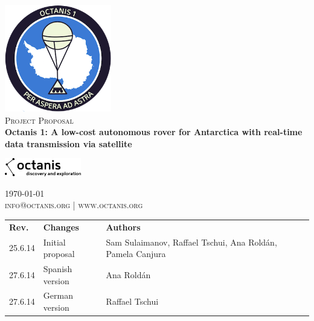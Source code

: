 \documentclass[a4paper,12pt]{article}
\begin{document}
\begin{titlepage}
\begin{center}

\includegraphics[width=0.35\textwidth]{patch}~\\[2cm]

\textsc{\Large Project Proposal}\\[0.5cm]

\huge \bfseries Octanis 1: A low-cost autonomous rover for Antarctica with real-time data transmission via satellite \\[0.4cm] 

  
\vspace{23pt}

\includegraphics[width=0.25\textwidth]{black_logo} \\


\vfill



{\large \today} \\
\textsc{\small info@octanis.org | www.octanis.org}
\vspace{50pt}


\begin{table}[h!]
\centering
\vspace{1pt}
\begin{tabular}{ l  l  l }
	\textbf{Rev.} & \textbf{Changes} & \textbf{Authors} \\
	25.6.14 & Initial proposal & Sam Sulaimanov, Raffael Tschui, Ana Roldán, Pamela Canjura \\
	27.6.14 & Spanish version & Ana Roldán \\
	27.6.14 & German version & Raffael Tschui \\
\end{tabular}
\end{table}

\end{center}
\end{titlepage}
\end{document}

